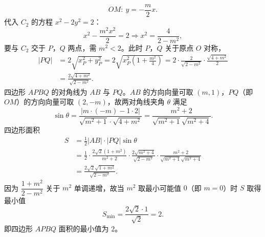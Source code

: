 \begin{answer}
\nopagebreak[4]
\[OM:\ y=-\frac m2x .\]
代入 $C_2$ 的方程 $x^2-2y^2=2$：
\nopagebreak[4]
\[x^2-\frac{m^2x^2}2=2\Longrightarrow x^2=\frac4{2-m^2},\]
要与 $C_2$ 交于 $P$，$Q$ 两点，需 $m^2<2$。此时 $P$，$Q$ 关于原点 $O$ 对称，
\nopagebreak[4]
\[\begin{aligned}
|PQ|&=2\sqrt{x_P^2+y_P^2}=2\sqrt{x_P^2\left(1+\frac{m^2}4\right)}
=2\cdot\frac2{\sqrt{2-m^2}}\cdot\frac{\sqrt{4+m^2}}2\\
&=\frac{2\sqrt{4+m^2}}{\sqrt{2-m^2}} .
\end{aligned}\]
四边形 $APBQ$ 的对角线为 $AB$ 与 $PQ$。$AB$ 的方向向量可取 $(m,1)$，$PQ$（即 $OM$）的方向向量可取 $(2,-m)$，故两对角线夹角 $\theta$ 满足
\nopagebreak[4]
\[\sin\theta=\frac{|m\cdot(-m)-1\cdot2|}{\sqrt{m^2+1}\cdot\sqrt{4+m^2}}=\frac{m^2+2}{\sqrt{m^2+1}\sqrt{m^2+4}} .\]
四边形面积
\nopagebreak[4]
\[\begin{aligned}
S&=\frac12|AB|\cdot|PQ|\sin\theta\\
&=\frac12\cdot\frac{2\sqrt2\left(1+m^2\right)}{m^2+2}\cdot\frac{2\sqrt{m^2+4}}{\sqrt{2-m^2}}\cdot\frac{m^2+2}{\sqrt{m^2+1}\sqrt{m^2+4}}\\
&=\frac{2\sqrt2\sqrt{1+m^2}}{\sqrt{2-m^2}} .
\end{aligned}\]
因为 $\dfrac{1+m^2}{2-m^2}$ 关于 $m^2$ 单调递增，故当 $m^2$ 取最小可能值 $0$（即 $m=0$）时 $S$ 取得最小值
\nopagebreak[4]
\[S_{\min}=\frac{2\sqrt2\cdot1}{\sqrt2}=2 .\]
即四边形 $APBQ$ 面积的最小值为 $2$。



\end{answer}
